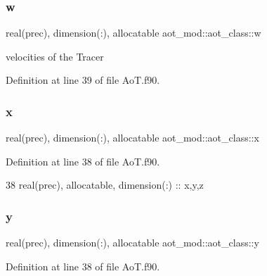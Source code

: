 \subsubsection{\texorpdfstring{w}{w}}
{\footnotesize\ttfamily real(prec), dimension(\+:), allocatable aot\+\_\+mod\+::aot\+\_\+class\+::w\hspace{0.3cm}{\ttfamily [private]}}



velocities of the Tracer 



Definition at line 39 of file Ao\+T.\+f90.

\mbox{\label{structaot__mod_1_1aot__class_a4a72558d7ea656f16aca0126e6925725}} 
\subsubsection{\texorpdfstring{x}{x}}
{\footnotesize\ttfamily real(prec), dimension(\+:), allocatable aot\+\_\+mod\+::aot\+\_\+class\+::x\hspace{0.3cm}{\ttfamily [private]}}



Definition at line 38 of file Ao\+T.\+f90.


\begin{DoxyCode}
38         \textcolor{keywordtype}{real(prec)}, \textcolor{keywordtype}{allocatable}, \textcolor{keywordtype}{dimension(:)} :: x,y,z
\end{DoxyCode}
\mbox{\label{structaot__mod_1_1aot__class_a72bd4c6e0f45ae10286a4a179bda49f0}} 
\subsubsection{\texorpdfstring{y}{y}}
{\footnotesize\ttfamily real(prec), dimension(\+:), allocatable aot\+\_\+mod\+::aot\+\_\+class\+::y\hspace{0.3cm}{\ttfamily [private]}}



Definition at line 38 of file Ao\+T.\+f90.

